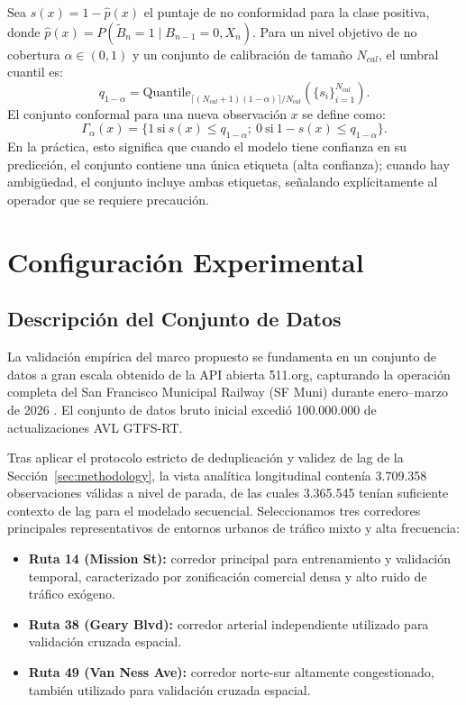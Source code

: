 \documentclass[fleqn,10pt,lineno]{wlpeerj}
\begin{document}
Sea $s(x)=1-\hat{p}(x)$ el puntaje de no conformidad para la clase positiva, donde $\hat{p}(x)=P(\tilde{B}_n=1\mid B_{n-1}=0, X_n)$. Para un nivel objetivo de no cobertura $\alpha\in(0,1)$ y un conjunto de calibraci\'on de tama\~no $N_{cal}$, el umbral cuantil es:
\begin{equation}
  q_{1-\alpha}=\mathrm{Quantile}_{\lceil (N_{cal}+1)(1-\alpha)\rceil /N_{cal}}\left(\{s_i\}_{i=1}^{N_{cal}}\right).
\end{equation}
El conjunto conformal para una nueva observaci\'on $x$ se define como:
\begin{equation}
  \Gamma_{\alpha}(x)=\{1\ \text{si}\ s(x)\le q_{1-\alpha};\ 0\ \text{si}\ 1-s(x)\le q_{1-\alpha}\}.
\end{equation}
En la pr\'actica, esto significa que cuando el modelo tiene confianza en su predicci\'on, el conjunto contiene una \'unica etiqueta (alta confianza); cuando hay ambig\"uedad, el conjunto incluye ambas etiquetas, se\~nalando expl\'icitamente al operador que se requiere precauci\'on.

\section{Configuraci\'on Experimental}
\label{sec:experiments}

\subsection{Descripci\'on del Conjunto de Datos}

La validaci\'on emp\'irica del marco propuesto se fundamenta en un conjunto de datos a gran escala obtenido de la API abierta 511.org, capturando la operaci\'on completa del San Francisco Municipal Railway (SF Muni) durante enero--marzo de 2026 \citep{28}. El conjunto de datos bruto inicial excedi\'o 100.000.000 de actualizaciones AVL GTFS-RT.

Tras aplicar el protocolo estricto de deduplicaci\'on y validez de lag de la Secci\'on~\ref{sec:methodology}, la vista anal\'itica longitudinal conten\'ia 3.709.358 observaciones v\'alidas a nivel de parada, de las cuales 3.365.545 ten\'ian suficiente contexto de lag para el modelado secuencial. Seleccionamos tres corredores principales representativos de entornos urbanos de tr\'afico mixto y alta frecuencia:
\begin{itemize}
  \item \textbf{Ruta 14 (Mission St):} corredor principal para entrenamiento y validaci\'on temporal, caracterizado por zonificaci\'on comercial densa y alto ruido de tr\'afico ex\'ogeno.
  \item \textbf{Ruta 38 (Geary Blvd):} corredor arterial independiente utilizado para validaci\'on cruzada espacial.
  \item \textbf{Ruta 49 (Van Ness Ave):} corredor norte-sur altamente congestionado, tambi\'en utilizado para validaci\'on cruzada espacial.
\end{itemize}
\end{document}
